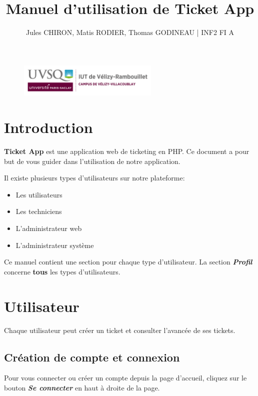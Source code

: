 \documentclass[12pt, a4paper]{article}
\title{Manuel d'utilisation de \textbf{Ticket App}}
\author{Jules CHIRON, Matis RODIER, Thomas GODINEAU | INF2 FI A}
\begin{document}
\maketitle

\begin{figure}[h]
    \includegraphics[width=0.6\textwidth]{annexes/logo_uvsq}
\end{figure}

\tableofcontents{}

\section*{Introduction}

\textbf{Ticket App} est une application web de ticketing en PHP.\@
Ce document a pour but de vous guider dans l'utilisation de notre application.

\bigskip
\noindent Il existe plusieurs types d'utilisateurs sur notre plateforme:
\begin{itemize}
    \item Les utilisateurs
    \item Les techniciens
    \item L'administrateur web
    \item L'administrateur système
\end{itemize}

\bigskip
\noindent Ce manuel contient une section pour chaque type d'utilisateur.
La section \textit{\textbf{Profil}} concerne \textbf{tous} les types d'utilisateurs.

\section{Utilisateur}

Chaque utilisateur peut créer un ticket et consulter l'avancée de ses tickets.

\subsection*{Création de compte et connexion}

Pour vous connecter ou créer un compte depuis la page d'accueil, cliquez sur le bouton \textit{\textbf{Se connecter}} en haut à droite de la page.
\end{document}
